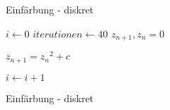 


\begin{frame}{Einfärbung - diskret}
    \begin{center}
        \begin{algorithmic}
            \State $i \gets 0$
            \State $iterationen \gets 40$
            \State $z_{n+1}, z_n = 0$
            
            \State $z_{n+1} = {z_n}^2 + c$

            \State \Return {}
            \EndIf

            \State $i \gets i + 1$
            \EndWhile

            \State \Return {}
            \EndFunction
        \end{algorithmic}
    \end{center}
\end{frame}

\begin{frame}{Einfärbung - diskret}
\end{frame}

